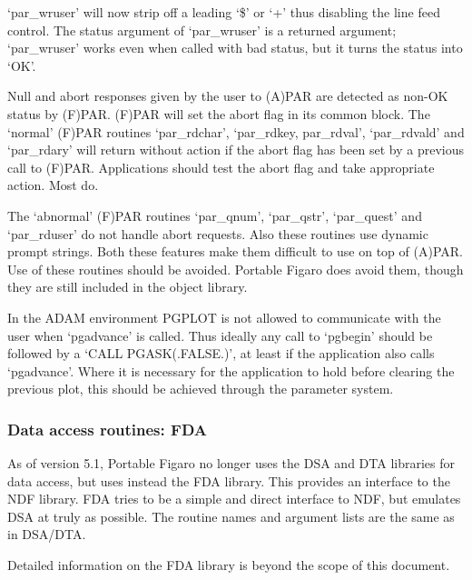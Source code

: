 \documentclass[11pt,twoside]{article}
\begin{document}
   `par\_wruser' will now strip off a leading `\$' or `+' thus disabling
   the line feed control. The status argument of `par\_wruser' is a
   returned argument; `par\_wruser' works even when called with bad
   status, but it turns the status into `OK'.

   Null and abort responses given by the user to (A)PAR are detected
   as non-OK status by (F)PAR. (F)PAR will set the abort flag in its
   common block. The `normal' (F)PAR routines `par\_rdchar', `par\_rdkey,
   par\_rdval', `par\_rdvald' and `par\_rdary' will return without action
   if the abort flag has been set by a previous call to (F)PAR.
   Applications should test the abort flag and take appropriate action.
   Most do.

   The `abnormal' (F)PAR routines `par\_qnum', `par\_qstr', `par\_quest'
   and `par\_rduser' do not handle abort requests.  Also these routines
   use dynamic prompt strings.  Both these features make them difficult
   to use on top of (A)PAR.  Use of these routines should be avoided.
   Portable Figaro does avoid them, though they are still included in
   the object library.

   In the ADAM environment PGPLOT is not allowed to communicate with the
   user when `pgadvance' is called.  Thus ideally any call to `pgbegin'
   should be followed by a `CALL PGASK(.FALSE.)', at least if the
   application also calls `pgadvance'.  Where it is necessary for the
   application to hold before clearing the previous plot, this should be
   achieved through the parameter system.


\subsubsection{\label{changessub5a}Data access routines: FDA}

   As of version 5.1, Portable Figaro no longer uses the DSA and DTA
   libraries for data access, but uses instead the FDA library. This
   provides an interface to the NDF library. FDA tries to be a simple
   and direct interface to NDF, but emulates DSA at truly as
   possible. The routine names and argument lists are the same as in
   DSA/DTA.

   Detailed information on the FDA library is beyond the scope of this
   document.

\end{document}
